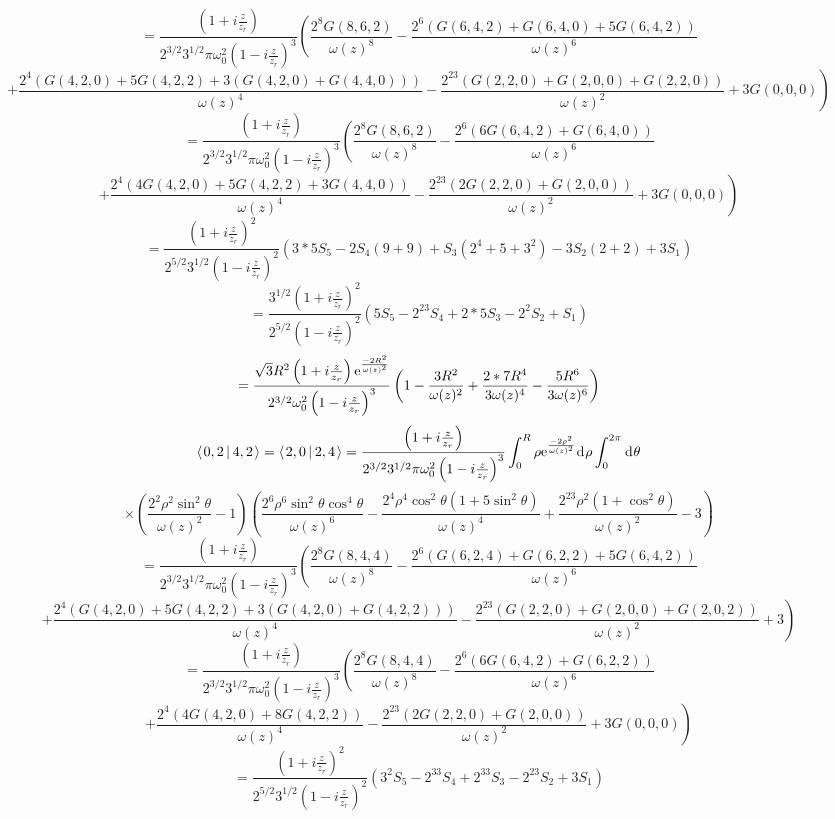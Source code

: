 \documentclass[11pt]{amsart}
\makeatletter
\newcommand{\e}{{\rm e}}				%
\newcommand{\msp}[1]{\mspace{#1mu}}		%
\newcommand{\0}{\varnothing}		%
\newcommand{\dd}{\msp{1} {\rm{d}} \msp{1}}	%
\newcommand{\brac}[2]{\left\langle\msp{2} #1\left\lvert \msp{3.5} #2 \right.\right\rangle}	%
\newcommand{\1}{!}
\newcommand{\2}{@}
\newcommand{\3}{\#}
\newcommand{\4}{\$}
\newcommand{\5}{\%}
\newcommand{\6}{$^\wedge$}
\newcommand{\7}{\&}
\newcommand{\8}{*}
\newcommand{\9}{(}
\makeatother
\begin{document}
\[
=\frac{\left(1+i\frac{z}{z_r}\right)}{2^{3/2}3^{1/2}\pi \omega_0^2\left(1-i\frac{z}{z_r}\right)^3}\left(\frac{2^8G(8,6,2)}{\omega(z)^8}-\frac{2^6\left(G(6,4,2)+G(6,4,0)+5G(6,4,2)\right)}{\omega(z)^6}
\right.
\]
\[
\left.+\frac{2^4\left(G(4,2,0)+5G(4,2,2)+3\left(G(4,2,0)+G(4,4,0)\right)\right)}{\omega(z)^4}-\frac{2^23\left(G(2,2,0)+G(2,0,0)+G(2,2,0)\right)}{\omega(z)^2}+3G(0,0,0)\right)
\]
\[
=\frac{\left(1+i\frac{z}{z_r}\right)}{2^{3/2}3^{1/2}\pi \omega_0^2\left(1-i\frac{z}{z_r}\right)^3}\left(\frac{2^8G(8,6,2)}{\omega(z)^8}-\frac{2^6\left(6G(6,4,2)+G(6,4,0)\right)}{\omega(z)^6}\right.
\]
\[
\left.+\frac{2^4\left(4G(4,2,0)+5G(4,2,2)+3G(4,4,0)\right)}{\omega(z)^4}-\frac{2^23\left(2G(2,2,0)+G(2,0,0)\right)}{\omega(z)^2}+3G(0,0,0)\right)
\]
\[
=\frac{\left(1+i\frac{z}{z_r}\right)^2}{2^{5/2}3^{1/2}\left(1-i\frac{z}{z_r}\right)^2}\left(3*5S_5-2S_4\left(9+9\right)+S_3\left(2^4+5+3^2\right)-3S_2\left(2+2\right)+3S_1\right)
\]
\[
=\frac{3^{1/2}\left(1+i\frac{z}{z_r}\right)^2}{2^{5/2}\left(1-i\frac{z}{z_r}\right)^2}\left(5S_5-2^23S_4+2*5S_3-2^2S_2+S_1\right)
\]
\[
=\frac{\sqrt{3}R^2\left(1+i\frac{z}{z_r}\right)\e^{\frac{-2R^2}{\omega(z)^2}}}{2^{3/2}\omega_0^2\left(1-i\frac{z}{z_r}\right)^3}\left(1-\frac{3R^2}{\omega(z)^2}+\frac{2*7R^4}{3\omega(z)^4}-\frac{5R^6}{3\omega(z)^6}\right)
\]
\[
\brac{0,2}{4,2} = \brac{2,0}{2,4} =  \frac{\left(1+i\frac{z}{z_r}\right)}{2^{3/2}3^{1/2}\pi\omega_0^2\left(1-i\frac{z}{z_r}\right)^3}\int_0^R\rho \e^{\frac{-2\rho^2}{\omega(z)^2}}\dd \rho\int_0^{2\pi} \dd \theta
\]
\[
\times\left(\frac{2^2\rho^2\sin^2\theta}{\omega(z)^2}-1\right)\left(\frac{2^6\rho^6\sin^2\theta\cos^4\theta}{\omega(z)^6}-\frac{2^4\rho^4\cos^2\theta\left(1+5\sin^2\theta\right)}{\omega(z)^4}+\frac{2^23\rho^2\left(1+\cos^2\theta\right)}{\omega(z)^2}-3\right)
\]
\[
=\frac{\left(1+i\frac{z}{z_r}\right)}{2^{3/2}3^{1/2}\pi\omega_0^2\left(1-i\frac{z}{z_r}\right)^3}\left(\frac{2^8G(8,4,4)}{\omega(z)^8}-\frac{2^6\left(G(6,2,4)+G(6,2,2)+5G(6,4,2)\right)}{\omega(z)^6}
\right.
\]
\[
\left.+\frac{2^4\left(G(4,2,0)+5G(4,2,2)+3\left(G(4,2,0)+G(4,2,2)\right)\right)}{\omega(z)^4}-\frac{2^23\left(G(2,2,0)+G(2,0,0)+G(2,0,2)\right)}{\omega(z)^2}+3\right)
\]
\[
=\frac{\left(1+i\frac{z}{z_r}\right)}{2^{3/2}3^{1/2}\pi\omega_0^2\left(1-i\frac{z}{z_r}\right)^3}\left(\frac{2^8G(8,4,4)}{\omega(z)^8}-\frac{2^6\left(6G(6,4,2)+G(6,2,2)\right)}{\omega(z)^6}\right.
\]
\[
\left. +\frac{2^4\left(4G(4,2,0)+8G(4,2,2)\right)}{\omega(z)^4}-\frac{2^23\left(2G(2,2,0)+G(2,0,0)\right)}{\omega(z)^2}+3G(0,0,0)\right)
\]
\[
=\frac{\left(1+i\frac{z}{z_r}\right)^2}{2^{5/2}3^{1/2} \left(1-i\frac{z}{z_r}\right)^2}\left(3^2S_5-2^33S_4+2^33S_3-2^23S_2+3S_1\right)
\]
\end{document}
